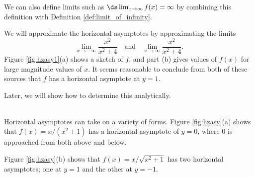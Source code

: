 We can also define limits such as $\ds\lim_{x\rightarrow\infty}f(x)=\infty$ by combining this definition with Definition \ref{def:limit_of_infinity}. \\ %

{}
{We will approximate the horizontal asymptotes by approximating the limits $$\lim_{x\to-\infty} \frac{x^2}{x^2+4}\quad \text{and}\quad \lim_{x\to\infty} \frac{x^2}{x^2+4}.$$ Figure \ref{fig:hzasy1}(a) shows a sketch of $f$, and part (b) gives values of $f(x)$ for large magnitude values of $x$. It seems reasonable to conclude from both of these sources that $f$ has a horizontal asymptote at $y=1$.


Later, we will show how to determine this analytically.}\\

Horizontal asymptotes can take on a variety of forms. Figure \ref{fig:hzasy}(a) shows that $f(x) = x/(x^2+1)$ has a horizontal asymptote of $y=0$, where 0 is approached from both above and below.


Figure \ref{fig:hzasy}(b) shows that $f(x) =x/\sqrt{x^2+1}$ has two horizontal asymptotes; one at $y=1$ and the other at $y=-1$.


